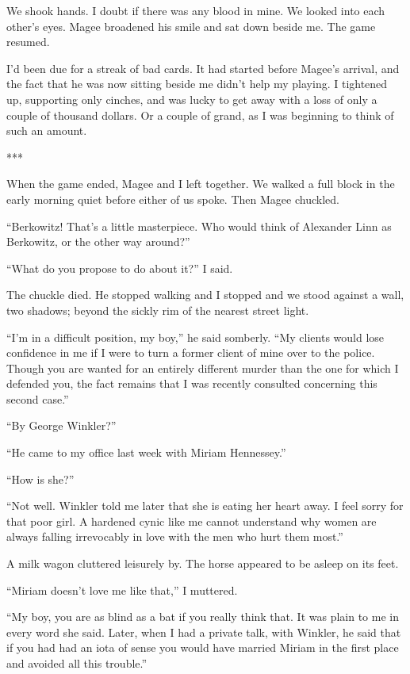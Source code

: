 \documentclass{novel}
\begin{document}
We shook hands. I doubt if there was any blood in mine. We looked into each other’s eyes. Magee broadened his smile and sat down beside me. The game resumed.

I’d been due for a streak of bad cards. It had started before Magee’s arrival, and the fact that he was now sitting beside me didn’t help my playing. I tightened up, supporting only cinches, and was lucky to get away with a loss of only a couple of thousand dollars. Or a couple of grand, as I was beginning to think of such an amount.

***

When the game ended, Magee and I left together. We walked a full block in the early morning quiet before either of us spoke. Then Magee chuckled.

“Berkowitz! That’s a little masterpiece. Who would think of Alexander Linn as Berkowitz, or the other way around?”

“What do you propose to do about it?” I said.

The chuckle died. He stopped walking and I stopped and we stood against a wall, two shadows; beyond the sickly rim of the nearest street light.

“I’m in a difficult position, my boy,” he said somberly. “My clients would lose confidence in me if I were to turn a former client of mine over to the police. Though you are wanted for an entirely different murder than the one for which I defended you, the fact remains that I was recently consulted concerning this second case.”

“By George Winkler?”

“He came to my office last week with Miriam Hennessey.”

“How is she?”

“Not well. Winkler told me later that she is eating her heart away. I feel sorry for that poor girl. A hardened cynic like me cannot understand why women are always falling irrevocably in love with the men who hurt them most.”

A milk wagon cluttered leisurely by. The horse appeared to be asleep on its feet.

“Miriam doesn’t love me like that,” I muttered.

“My boy, you are as blind as a bat if you really think that. It was plain to me in every word she said. Later, when I had a private talk, with Winkler, he said that if you had had an iota of sense you would have married Miriam in the first place and avoided all this trouble.”
\end{document}
